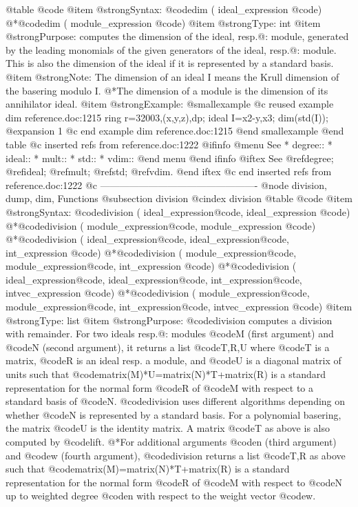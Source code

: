 @table @code
@item @strong{Syntax:}
@code{dim (} ideal_expression @code{)}
@*@code{dim (} module_expression @code{)}
@item @strong{Type:}
int
@item @strong{Purpose:}
computes the dimension of the ideal, resp.@: module, generated by
the leading monomials of the given generators of the ideal, resp.@: module.
This is also the dimension of the ideal if it is represented by
a standard basis.
@item @strong{Note:}
The dimension of an ideal I means
the Krull dimension of the basering modulo I.
@*The dimension of a
module is the dimension of its annihilator ideal.
@item @strong{Example:}
@smallexample
@c reused example dim reference.doc:1215 
  ring r=32003,(x,y,z),dp;
  ideal I=x2-y,x3;
  dim(std(I));
@expansion{} 1
@c end example dim reference.doc:1215
@end smallexample
@end table
@c inserted refs from reference.doc:1222
@ifinfo
@menu
See
* degree::
* ideal::
* mult::
* std::
* vdim::
@end menu
@end ifinfo
@iftex
See
@ref{degree};
@ref{ideal};
@ref{mult};
@ref{std};
@ref{vdim}.
@end iftex
@c end inserted refs from reference.doc:1222
@c -------------------------------------------------
@node division, dump, dim, Functions
@subsection division
@cindex division
@table @code
@item @strong{Syntax:}
@code{division (} ideal_expression@code{,} ideal_expression @code{)}
@*@code{division (} module_expression@code{,} module_expression @code{)}
@*@code{division (} ideal_expression@code{,} ideal_expression@code{,} int_expression @code{)}
@*@code{division (} module_expression@code{,} module_expression@code{,} int_expression @code{)}
@*@code{division (} ideal_expression@code{,} ideal_expression@code{,} int_expression@code{,} intvec_expression @code{)}
@*@code{division (} module_expression@code{,} module_expression@code{,} int_expression@code{,} intvec_expression @code{)}
@item @strong{Type:}
list
@item @strong{Purpose:}
@code{division} computes a division with remainder.
For two ideals resp.@: modules @code{M} (first argument) and @code{N} (second argument), it returns a list @code{T,R,U} where @code{T} is a matrix, @code{R} is an ideal resp. a module, and @code{U} is a diagonal matrix of units such that @code{matrix(M)*U=matrix(N)*T+matrix(R)} is a standard representation for the normal form @code{R} of @code{M} with respect to a standard basis of @code{N}.
@code{division} uses different algorithms depending on whether @code{N} is represented by a standard basis.
For a polynomial basering, the matrix @code{U} is the identity matrix.
A matrix @code{T} as above is also computed by @code{lift}.
@*For additional arguments @code{n} (third argument) and @code{w} (fourth argument), @code{division} returns a list @code{T,R} as above such that @code{matrix(M)=matrix(N)*T+matrix(R)} is a standard representation for the normal form @code{R} of @code{M} with respect to @code{N} up to weighted degree @code{n} with respect to the weight vector @code{w}.
